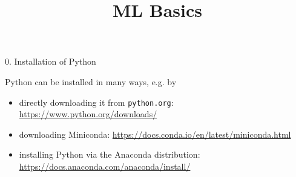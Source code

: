 



\newcommand{\titlefigure}{figure/python.png}
\newcommand{\learninggoals}{
\item Understand the different package management systems
\item Be comfortable in settig up a python environment
\item Know how to make your work reproducible with Python}

\title{ML Basics}
\date{}




\begin{vbframe}{0. Installation of Python}

\vfill

Python can be installed in many ways, e.g. by

	\begin{itemize}
		\item directly downloading it from \texttt{python.org}: \url{https://www.python.org/downloads/}
		\item downloading Miniconda: \url{https://docs.conda.io/en/latest/miniconda.html}
		\item installing Python via the Anaconda distribution: \url{https://docs.anaconda.com/anaconda/install/}
	\end{itemize}

\vfill

\end{vbframe}


